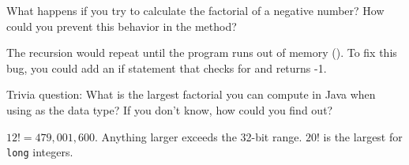 \Q What happens if you try to calculate the factorial of a negative number?
How could you prevent this behavior in the  method?

\begin{answer}
The recursion would repeat until the program runs out of memory ().
To fix this bug, you could add an if statement that checks for  and returns -1.
\end{answer}


\Q Trivia question: What is the largest factorial you can compute in Java when using  as the data type? If you don't know, how could you find out?

\begin{answer}
$12! = 479,001,600$. Anything larger exceeds the 32-bit range. $20!$ is the largest for \texttt{long} integers.
\end{answer}

